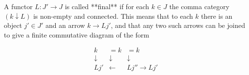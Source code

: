 A functor $L: J' \rightarrow J$ is called **final** if for each $k \in J$ the comma category $(k \downarrow L)$ is non-empty and connected. This means that to each $k$ there is an object $j' \in J'$ and an arrow $k \rightarrow Lj'$, and that any two such arrows can be joined to give a finite commutative diagram of the form

$$\begin{array}{ccc}
k &= k &= k \\
\downarrow & \downarrow & \downarrow \\
Lj' & \leftarrow & Lj'' \rightarrow Lj'
\end{array}$$
